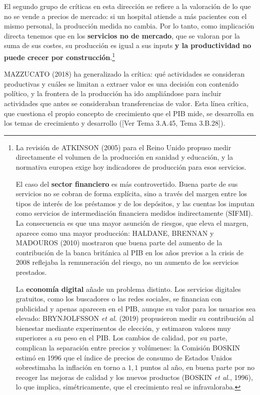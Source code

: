 \documentclass[10pt,a4paper]{article}
\newcommand{\authorfont}[1]{{\fontfamily{EBGaramond-TLF}\selectfont #1}}
\begin{document}
El segundo grupo de críticas en esta dirección se refiere a la valoración de lo que no se vende a precios de mercado: si un hospital atiende a más pacientes con el mismo personal, la producción medida no cambia. Por lo tanto, como implicación directa tenemos que en los \textbf{servicios no de mercado}, que se valoran por la suma de sus costes, su producción es igual a sus inputs \textbf{y la productividad no puede crecer por construcción}.\footnote{%
  La revisión de ATKINSON (2005) para el Reino Unido propuso medir directamente el volumen de la producción en sanidad y educación, y la normativa europea exige hoy indicadores de producción para esos servicios.

  El caso del \textbf{sector financiero} es más controvertido. Buena parte de sus servicios no se cobran de forma explícita, sino a través del margen entre los tipos de interés de los préstamos y de los depósitos, y las cuentas los imputan como servicios de intermediación financiera medidos indirectamente (SIFMI). La consecuencia es que una mayor asunción de riesgos, que eleva el margen, aparece como una mayor producción: HALDANE, BRENNAN y MADOUROS (2010) mostraron que buena parte del aumento de la contribución de la banca británica al PIB en los años previos a la crisis de 2008 reflejaba la remuneración del riesgo, no un aumento de los servicios prestados. 
  
  La \textbf{economía digital} añade un problema distinto. Los servicios digitales gratuitos, como los buscadores o las redes sociales, se financian con publicidad y apenas aparecen en el PIB, aunque su valor para los usuarios sea elevado: BRYNJOLFSSON \textit{et al.} (2019) propusieron medir su contribución al bienestar mediante experimentos de elección, y estimaron valores muy superiores a su peso en el PIB. Los cambios de calidad, por su parte, complican la separación entre precios y volúmenes: la Comisión BOSKIN estimó en 1996 que el índice de precios de consumo de Estados Unidos sobrestimaba la inflación en torno a $1{,}1$ puntos al año, en buena parte por no recoger las mejoras de calidad y los nuevos productos (BOSKIN \textit{et al.}, 1996), lo que implica, simétricamente, que el crecimiento real se infravaloraba.
} 

MAZZUCATO (2018) ha generalizado la crítica: qué actividades se consideran productivas y cuáles se limitan a extraer valor es una decisión con contenido político, y la frontera de la producción ha ido ampliándose para incluir actividades que antes se consideraban transferencias de valor. Esta línea crítica, que cuestiona el propio concepto de crecimiento que el PIB mide, se desarrolla en los temas de crecimiento y desarrollo ([\authorfont{Ver Tema 3.A.45, Tema 3.B.28}]).
\end{document}

